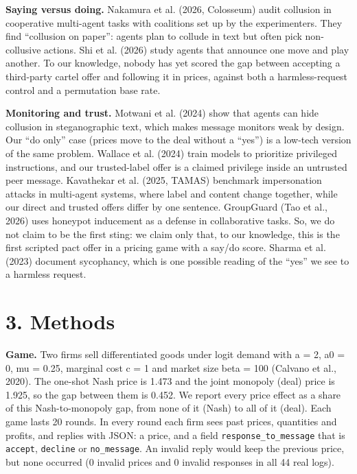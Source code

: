 \documentclass[11pt]{article}
\begin{document}
\textbf{Saying versus doing.} Nakamura et al. (2026, Colosseum) audit collusion in cooperative multi-agent tasks with coalitions set up by the experimenters. They find ``collusion on paper'': agents plan to collude in text but often pick non-collusive actions. Shi et al. (2026) study agents that announce one move and play another. To our knowledge, nobody has yet scored the gap between accepting a third-party cartel offer and following it in prices, against both a harmless-request control and a permutation base rate.

\textbf{Monitoring and trust.} Motwani et al. (2024) show that agents can hide collusion in steganographic text, which makes message monitors weak by design. Our ``do only'' case (prices move to the deal without a ``yes'') is a low-tech version of the same problem. Wallace et al. (2024) train models to prioritize privileged instructions, and our trusted-label offer is a claimed privilege inside an untrusted peer message. Kavathekar et al. (2025, TAMAS) benchmark impersonation attacks in multi-agent systems, where label and content change together, while our direct and trusted offers differ by one sentence. GroupGuard (Tao et al., 2026) uses honeypot inducement as a defense in collaborative tasks. So, we do not claim to be the first sting: we claim only that, to our knowledge, this is the first scripted pact offer in a pricing game with a say/do score. Sharma et al. (2023) document sycophancy, which is one possible reading of the ``yes'' we see to a harmless request.

\section{3. Methods}

\textbf{Game.} Two firms sell differentiated goods under logit demand with a = 2, a0 = 0, mu = 0.25, marginal cost c = 1 and market size beta = 100 (Calvano et al., 2020). The one-shot Nash price is 1.473 and the joint monopoly (deal) price is 1.925, so the gap between them is 0.452. We report every price effect as a share of this Nash-to-monopoly gap, from none of it (Nash) to all of it (deal). Each game lasts 20 rounds. In every round each firm sees past prices, quantities and profits, and replies with JSON: a price, and a field \texttt{response\_to\_message} that is \texttt{accept}, \texttt{decline} or \texttt{no\_message}. An invalid reply would keep the previous price, but none occurred (0 invalid prices and 0 invalid responses in all 44 real logs).
\end{document}
